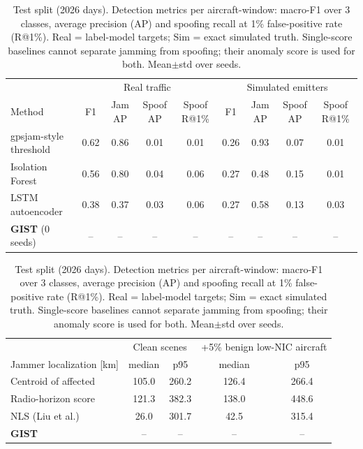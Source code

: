 \begin{table}[t]\centering\small
\caption{Test split (2026 days). Detection metrics per aircraft-window: macro-F1 over 3 classes, average precision (AP) and spoofing recall at 1\% false-positive rate (R@1\%). Real = label-model targets; Sim = exact simulated truth. Single-score baselines cannot separate jamming from spoofing; their anomaly score is used for both. Mean$\pm$std over seeds.}
\label{tab:results}
\begin{tabular}{@{}lcccc|cccc@{}}\toprule
 & \multicolumn{4}{c|}{Real traffic} & \multicolumn{4}{c}{Simulated emitters}\\
Method & F1 & Jam AP & Spoof AP & Spoof R@1\% & F1 & Jam AP & Spoof AP & Spoof R@1\% \\\midrule
gpsjam-style threshold & 0.62 & 0.86 & 0.01 & 0.01 & 0.26 & 0.93 & 0.07 & 0.01 \\
Isolation Forest & 0.56 & 0.80 & 0.04 & 0.06 & 0.27 & 0.48 & 0.15 & 0.01 \\
LSTM autoencoder & 0.38 & 0.37 & 0.03 & 0.06 & 0.27 & 0.58 & 0.13 & 0.03 \\
\textbf{GIST} (0 seeds) & -- & -- & -- & -- & -- & -- & -- & -- \\
\bottomrule\end{tabular}\vspace{6pt}

\begin{tabular}{@{}lcc|cc@{}}\toprule
 & \multicolumn{2}{c|}{Clean scenes} & \multicolumn{2}{c}{+5\% benign low-NIC aircraft}\\
Jammer localization [km] & median & p95 & median & p95 \\\midrule
Centroid of affected & 105.0 & 260.2 & 126.4 & 266.4 \\
Radio-horizon score & 121.3 & 382.3 & 138.0 & 448.6 \\
NLS (Liu et al.) & 26.0 & 301.7 & 42.5 & 315.4 \\
\textbf{GIST} & -- & -- & -- & -- \\
\bottomrule\end{tabular}
\end{table}
